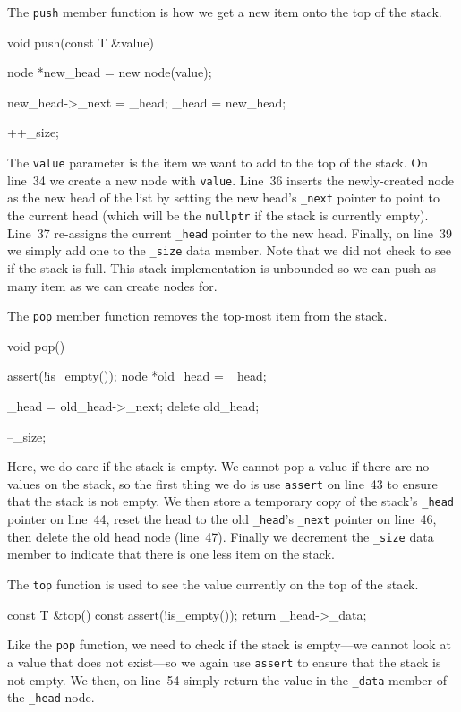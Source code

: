 \documentclass{article}
\begin{document}
  The \verb|push| member function is how we get a new item onto the top of the stack.
  \begin{lstcpp}
  void push(const T &value)
  {
    node *new_head = new node(value);

    new_head->_next = _head;
    _head = new_head;

    ++_size;
  }\end{lstcpp}
  The \verb|value| parameter is the item we want to add to the top of the stack. On line~34 we create a new node with \verb|value|. Line~36 inserts the newly-created node as the new head of the list by setting the new head's \verb|_next| pointer to point to the current head (which will be the \verb|nullptr| if the stack is currently empty). Line~37 re-assigns the current \verb|_head| pointer to the new head. Finally, on line~39 we simply add one to the \verb|_size| data member. Note that we did not check to see if the stack is full. This stack implementation is unbounded so we can push as many item as we can create nodes for.

  The \verb|pop| member function removes the top-most item from the stack.
  \begin{lstcpp}
  void pop()
  {
    assert(!is_empty());
    node *old_head = _head;

    _head = old_head->_next;
    delete old_head;

    --_size;
  }\end{lstcpp}
  Here, we do care if the stack is empty. We cannot pop a value if there are no values on the stack, so the first thing we do is use \verb|assert| on line~43 to ensure that the stack is not empty. We then store a temporary copy of the stack's \verb|_head| pointer on line~44, reset the head to the old \verb|_head|'s \verb|_next| pointer on line~46, then delete the old head node (line~47). Finally we decrement the \verb|_size| data member to indicate that there is one less item on the stack.

  The \verb|top| function is used to see the value currently on the top of the stack.
  \begin{lstcpp}
  const T &top() const
  {
    assert(!is_empty());
    return _head->_data;
  }\end{lstcpp}
  Like the \verb|pop| function, we need to check if the stack is empty---we cannot look at a value that does not exist---so we again use \verb|assert| to ensure that the stack is not empty. We then, on line~54 simply return the value in the \verb|_data| member of the \verb|_head| node.
\end{document}
